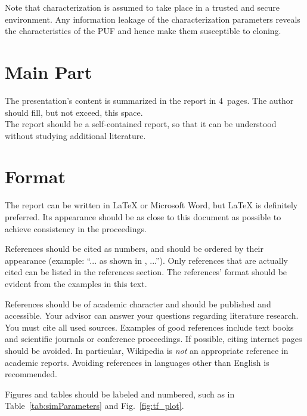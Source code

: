 \documentclass[journal, a4paper]{IEEEtran}
\begin{document}
Note that characterization is assumed to take place in a trusted and secure environment. Any information leakage of the characterization parameters reveals the characteristics of the PUF and hence make them susceptible to cloning.


\section{Main Part}
The presentation's content is summarized in the report in 4~pages.
The author should fill, but not exceed, this space. \\
The report should be a self-contained report, so that it can be understood without studying additional literature.

\section{Format}
The report can be written in \LaTeX{} or Microsoft Word, but \LaTeX{} is definitely preferred.
Its appearance should be as close to this document as possible to achieve consistency in the proceedings.

References should be cited as numbers, and should be ordered by their appearance (example: ``... as shown in \cite{HOP96}, ...'').
Only references that are actually cited can be listed in the references section.
The references' format should be evident from the examples in this text.

References should be of academic character and should be published and accessible.
Your advisor can answer your questions regarding literature research.
You must cite all used sources.
Examples of good references include text books and scientific journals or conference proceedings.
If possible, citing internet pages should be avoided. In particular, Wikipedia is \emph{not} an appropriate reference in academic reports.
Avoiding references in languages other than English is recommended.

Figures and tables should be labeled and numbered, such as in Table~\ref{tab:simParameters} and Fig.~\ref{fig:tf_plot}.
\end{document}
